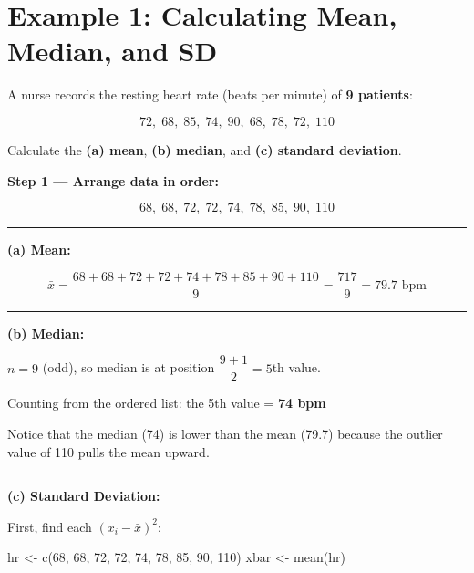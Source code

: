 \documentclass[
  12pt,
  letterpaper,
]{book}
\newenvironment{Shaded}{\begin{snugshade}}{\end{snugshade}}
\newcommand{\DecValTok}[1]{\textcolor[rgb]{0.68,0.00,0.00}{#1}}
\newcommand{\FunctionTok}[1]{\textcolor[rgb]{0.28,0.35,0.67}{#1}}
\newcommand{\NormalTok}[1]{\textcolor[rgb]{0.00,0.23,0.31}{#1}}
\newcommand{\OtherTok}[1]{\textcolor[rgb]{0.00,0.23,0.31}{#1}}
\begin{document}
\section{Example 1: Calculating Mean, Median, and
SD}\label{example-1-calculating-mean-median-and-sd}

A nurse records the resting heart rate (beats per minute) of \textbf{9
patients}:

\[72, \; 68, \; 85, \; 74, \; 90, \; 68, \; 78, \; 72, \; 110\]

Calculate the \textbf{(a) mean}, \textbf{(b) median}, and \textbf{(c)
standard deviation}.

\begin{tcolorbox}[enhanced jigsaw, arc=.35mm, bottomrule=.15mm, bottomtitle=1mm, breakable, colback=white, colbacktitle=quarto-callout-tip-color!10!white, colframe=quarto-callout-tip-color-frame, coltitle=black, left=2mm, leftrule=.75mm, opacityback=0, opacitybacktitle=0.6, rightrule=.15mm, title={✅ Solution}, titlerule=0mm, toprule=.15mm, toptitle=1mm]

\textbf{Step 1 --- Arrange data in order:}

\[68, \; 68, \; 72, \; 72, \; 74, \; 78, \; 85, \; 90, \; 110\]

\begin{center}\rule{0.5\linewidth}{0.5pt}\end{center}

\textbf{(a) Mean:}

\[\bar{x} = \frac{68+68+72+72+74+78+85+90+110}{9} = \frac{717}{9} = 79.7 \text{ bpm}\]

\begin{center}\rule{0.5\linewidth}{0.5pt}\end{center}

\textbf{(b) Median:}

\(n = 9\) (odd), so median is at position \(\dfrac{9+1}{2} = 5\)th
value.

Counting from the ordered list: the 5th value = \textbf{74 bpm}

Notice that the median (74) is lower than the mean (79.7) because the
outlier value of 110 pulls the mean upward.

\begin{center}\rule{0.5\linewidth}{0.5pt}\end{center}

\textbf{(c) Standard Deviation:}

First, find each \((x_i - \bar{x})^2\):

\begin{Shaded}
\begin{Highlighting}[]
\NormalTok{hr }\OtherTok{\textless{}{-}} \FunctionTok{c}\NormalTok{(}\DecValTok{68}\NormalTok{, }\DecValTok{68}\NormalTok{, }\DecValTok{72}\NormalTok{, }\DecValTok{72}\NormalTok{, }\DecValTok{74}\NormalTok{, }\DecValTok{78}\NormalTok{, }\DecValTok{85}\NormalTok{, }\DecValTok{90}\NormalTok{, }\DecValTok{110}\NormalTok{)}
\NormalTok{xbar }\OtherTok{\textless{}{-}} \FunctionTok{mean}\NormalTok{(hr)}


\end{Highlighting}
\end{Shaded}
\end{tcolorbox}
\end{document}
